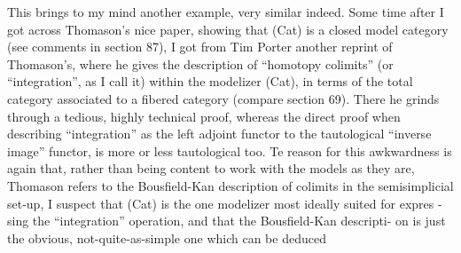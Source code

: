 This brings to my mind another example, very similar indeed.
Some time after I got across Thomason's nice paper, showing that
(Cat) is a closed model category (see comments in section 87), I got
from Tim Porter another  reprint of Thomason's, where he gives the
description of ``homotopy colimits'' (or ``integration'', as I call it)
within the modelizer (Cat), in terms of the total category
associated to a fibered category (compare section 69). There he grinds
through a tedious, highly technical proof, whereas the direct proof
when describing ``integration'' as the left adjoint functor to the
tautological ``inverse image'' functor, is more or less tautological
too. Te reason for this awkwardness is again that, rather than
being content to work with the models as they are, Thomason refers to
the Bousfield-Kan description of colimits in the semisimplicial set-up, 
I suspect that (Cat) is the one modelizer most ideally suited for expres%
-sing the ``integration'' operation, and that the Bousfield-Kan descripti-%
on is just the obvious, not-quite-as-simple one which can be deduced
